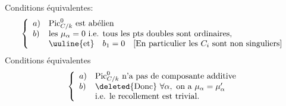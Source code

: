 Conditions équivalentes:
\[
\left\{\begin{array}{ll}
a)&\mathrm{Pic}_{C/k}^0\text{ est abélien}\\
b)&\text{les }\mu_\alpha=0\text{ i.e. tous les pts doubles sont ordinaires,}\\
&\uuline{\text{et}}\quad b_1=0\quad[\text{En particulier les }C_i\text{ sont non singuliers}]
\end{array}\right.
\]
Conditions équivalentes
\[
\left\{\begin{array}{ll}
a)&\mathrm{Pic}_{C/k}^0\text{ n'a pas de composante additive}\\
b)&\deleted{\text{Donc}}\ \forall\alpha,\text{ on a }\mu_\alpha=\mu'_\alpha\\
&\text{i.e. le recollement est trivial.}
\end{array}\right.
\]
